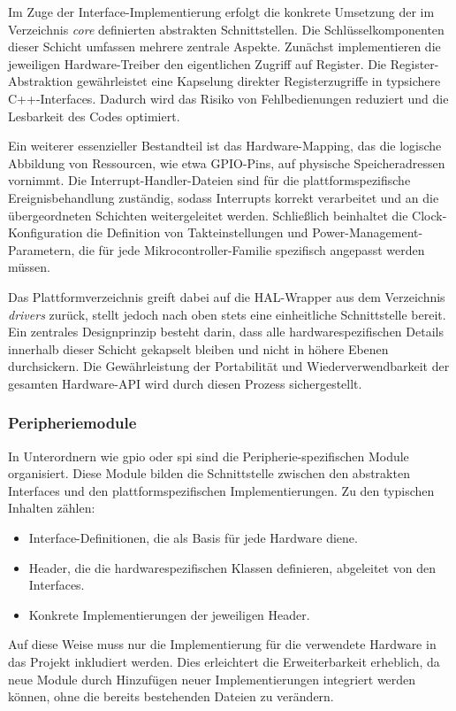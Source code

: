 Im Zuge der Interface-Implementierung erfolgt die konkrete Umsetzung der im Verzeichnis \textit{core} definierten abstrakten Schnittstellen. 
Die Schlüsselkomponenten dieser Schicht umfassen mehrere zentrale Aspekte. 
Zunächst implementieren die jeweiligen Hardware-Treiber den eigentlichen Zugriff auf Register.
Die Register-Abstraktion gewährleistet eine Kapselung direkter Registerzugriffe in typsichere C++-Interfaces. 
Dadurch wird das Risiko von Fehlbedienungen reduziert und die Lesbarkeit des Codes optimiert.

Ein weiterer essenzieller Bestandteil ist das Hardware-Mapping, das die logische Abbildung von Ressourcen, wie etwa GPIO-Pins, auf physische Speicheradressen vornimmt. 
Die Interrupt-Handler-Dateien sind für die plattformspezifische Ereignisbehandlung zuständig, sodass Interrupts korrekt verarbeitet und an die übergeordneten Schichten weitergeleitet werden. 
Schließlich beinhaltet die Clock-Konfiguration die Definition von Takteinstellungen und Power-Management-Parametern, die für jede Mikrocontroller-Familie spezifisch angepasst werden müssen.

Das Plattformverzeichnis greift dabei auf die HAL-Wrapper aus dem Verzeichnis \textit{drivers} zurück, stellt jedoch nach oben stets eine einheitliche Schnittstelle bereit. 
Ein zentrales Designprinzip besteht darin, dass alle hardwarespezifischen Details innerhalb dieser Schicht gekapselt bleiben und nicht in höhere Ebenen durchsickern. 
Die Gewährleistung der Portabilität und Wiederverwendbarkeit der gesamten Hardware-API wird durch diesen Prozess sichergestellt.

\subsubsection*{Peripheriemodule}
In Unterordnern wie gpio oder spi sind die Peripherie-spezifischen Module organisiert. 
Diese Module bilden die Schnittstelle zwischen den abstrakten Interfaces und den plattformspezifischen Implementierungen.
Zu den typischen Inhalten zählen:
\begin{itemize}
	\item Interface-Definitionen, die als Basis für jede Hardware diene.
	\item Header, die die hardwarespezifischen Klassen definieren, abgeleitet von den Interfaces.
	\item Konkrete Implementierungen der jeweiligen Header.
\end{itemize}

Auf diese Weise muss nur die Implementierung für die verwendete Hardware in das Projekt inkludiert werden.
Dies erleichtert die Erweiterbarkeit erheblich, da neue Module durch Hinzufügen neuer Implementierungen integriert werden können, ohne die bereits bestehenden Dateien zu verändern.


